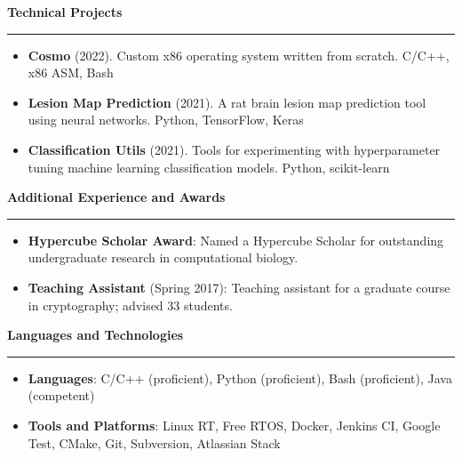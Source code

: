 \documentclass[10pt,letterpaper]{article}
\begin{document}
\medskip

\begin{large}
    \textbf{Technical Projects}
\end{large}

\smallskip \hrule \smallskip

\begin{itemize}[topsep=0pt]
    \setlength\itemsep{0.2em}
    \item \textbf{Cosmo} (2022). Custom x86 operating system written from
                                 scratch. C/C++, x86 ASM, Bash
    \item \textbf{Lesion Map Prediction} (2021). A rat brain lesion map
                                                 prediction tool using neural
                                                 networks.
                                                 Python, TensorFlow, Keras
    \item \textbf{Classification Utils} (2021). Tools for experimenting with
                                                hyperparameter tuning machine
                                                learning classification models.
                                                Python, scikit-learn
\end{itemize}

\medskip

\begin{large}
    \textbf{Additional Experience and Awards}
\end{large}

\smallskip \hrule \smallskip

\begin{itemize}[topsep=0pt]
    \setlength\itemsep{0.2em}
    \item \textbf{Hypercube Scholar Award}: Named a Hypercube Scholar for
          outstanding undergraduate research in computational biology.
    \item \textbf{Teaching Assistant} (Spring 2017): Teaching assistant for a
          graduate course in cryptography; advised 33 students.
\end{itemize}

\medskip

\begin{large}
    \textbf{Languages and Technologies}
\end{large}

\smallskip \hrule \smallskip

\begin{itemize}[topsep=0pt]
    \setlength\itemsep{0.2em}
    \item \textbf{Languages}: C/C++ (proficient),
                              Python (proficient),
                              Bash (proficient),
                              Java (competent)
    \item \textbf{Tools and Platforms}: Linux RT,
                                        Free RTOS,
                                        Docker,
                                        Jenkins CI,
                                        Google Test,
                                        CMake,
                                        Git,
                                        Subversion,
                                        Atlassian Stack
\end{itemize}
\end{document}

